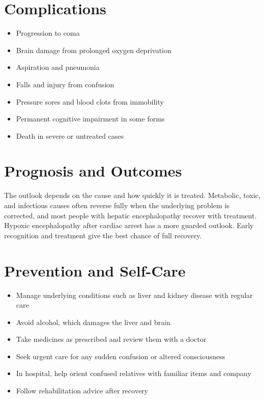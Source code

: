 \section*{Complications}
\begin{itemize}
    \item Progression to coma
    \item Brain damage from prolonged oxygen deprivation
    \item Aspiration and pneumonia
    \item Falls and injury from confusion
    \item Pressure sores and blood clots from immobility
    \item Permanent cognitive impairment in some forms
    \item Death in severe or untreated cases
\end{itemize}

\section*{Prognosis and Outcomes}
The outlook depends on the cause and how quickly it is treated. Metabolic, toxic, and infectious causes often reverse fully when the underlying problem is corrected, and most people with hepatic encephalopathy recover with treatment. Hypoxic encephalopathy after cardiac arrest has a more guarded outlook. Early recognition and treatment give the best chance of full recovery.

\section*{Prevention and Self-Care}
\begin{itemize}
    \item Manage underlying conditions such as liver and kidney disease with regular care
    \item Avoid alcohol, which damages the liver and brain
    \item Take medicines as prescribed and review them with a doctor
    \item Seek urgent care for any sudden confusion or altered consciousness
    \item In hospital, help orient confused relatives with familiar items and company
    \item Follow rehabilitation advice after recovery
\end{itemize}


